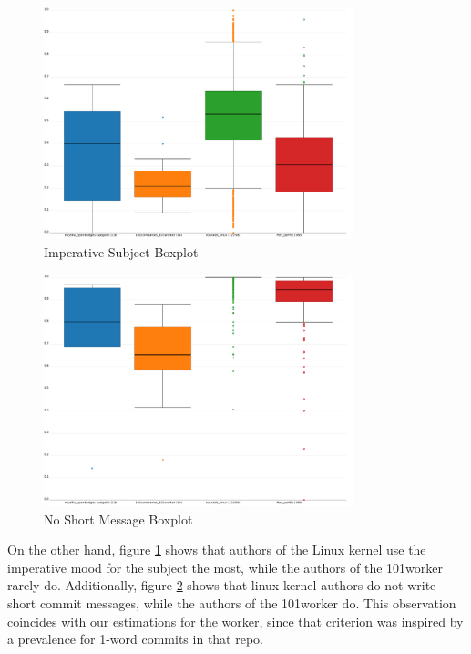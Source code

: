 \begin{figure}[p]
    \centering
    \includegraphics[width=0.8\textwidth]{img/imperative_subject.pdf}
    \caption{Imperative Subject Boxplot}
    \label{fig:bp_imperative_subject}
\end{figure}

\begin{figure}[p]
    \centering
    \includegraphics[width=0.8\textwidth]{img/no_short_message.pdf}
    \caption{No Short Message Boxplot}
    \label{fig:bp_no_short_message}
\end{figure}

On the other hand, figure \ref{fig:bp_imperative_subject} shows that authors of the Linux kernel use the imperative mood for the subject the most, while the authors of the 101worker rarely do. Additionally, figure \ref{fig:bp_no_short_message} shows that linux kernel authors do not write short commit messages, while the authors of the 101worker do. This observation coincides with our estimations for the worker, since that criterion was inspired by a prevalence for 1-word commits in that repo.

